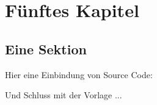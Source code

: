 \chapter{F\"unftes Kapitel}
\section{Eine Sektion}

Hier eine Einbindung von Source Code:

Und Schluss mit der Vorlage ...
